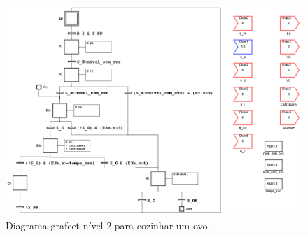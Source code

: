\begin{figure}[!h]
\centering
\includegraphics[width=\textwidth]{figuras/ovoNivel2}
\caption{Diagrama grafcet nível 2 para cozinhar um ovo.}
\label{fig:grafcetOvo2}
\end{figure}
